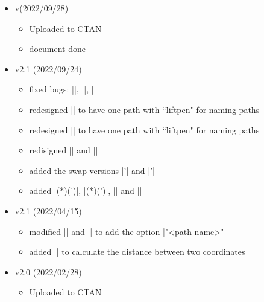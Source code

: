 \documentclass[a4paper,amsmath,chapter]{oblivoir}
\begin{document}
\begin{itemize}
\item v\tmpversion (2022/09/28)
  \begin{itemize}
  \item Uploaded to CTAN
  \item document done
  \end{itemize}
\item v2.1 (2022/09/24)
  \begin{itemize}
  \item fixed bugs: |\tzplot|, |\tzplotcurve|, |\tzslope|
  \item redesigned |\tzaxes| to have one path with ``liftpen" for naming paths
  \item redesigned |\tzaxesL| to have one path with ``liftpen" for naming paths
  \item redisigned |\tzslopeat| and |\tzslope|
  \item added the swap versions |\tzslopeat'| and |\tzslope'|
  \item added |\tznormal(*)(')|, |\tznormalat(*)(')|, |\settznormalepsilon| and |\settznormallayer|
  \end{itemize}
\item v2.1 (2022/04/15)
  \begin{itemize}
  \item modified |\tzaxisx| and |\tzaxisy| to add the option |"<path name>"|
  \item added |\tzdistance| to calculate the distance between two coordinates 
  \end{itemize}
\item v2.0 (2022/02/28)
  \begin{itemize}
  \item Uploaded to CTAN
  \end{itemize}

\end{itemize}
\end{document}
